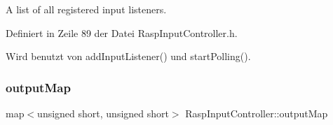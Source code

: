 A list of all registered input listeners. 



Definiert in Zeile 89 der Datei Rasp\+Input\+Controller.\+h.



Wird benutzt von add\+Input\+Listener() und start\+Polling().

\mbox{\label{class_rasp_input_controller_a7b59eba5cc562eccc91347ddbd777e50}} 
\subsubsection{\texorpdfstring{output\+Map}{outputMap}}
{\footnotesize\ttfamily map$<$unsigned short, unsigned short$>$ Rasp\+Input\+Controller\+::output\+Map\hspace{0.3cm}{\ttfamily [private]}}

